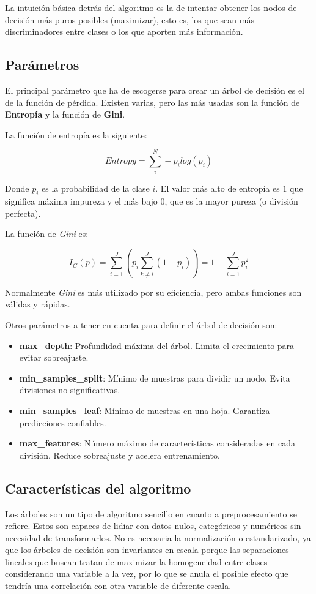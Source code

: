 \documentclass[12pt,letterpaper]{article}
\begin{document}
La intuición básica detrás del algoritmo es la de intentar obtener los nodos de decisión más puros posibles (maximizar), esto es, los que sean más discriminadores entre clases o los que aporten más información.

\subsection{Parámetros}
El principal parámetro que ha de escogerse para crear un árbol de decisión es el de la función de pérdida. Existen varias, pero las más usadas son la función de \textbf{Entropía} y la función de \textbf{Gini}.

La función de entropía es la siguiente:

\begin{equation}
    Entropy=\sum_{i}^{N}-p_{i}log(p_{i})
\end{equation}

Donde $p_i$ es la probabilidad de la clase $i$. El valor más alto de entropía es $1$ que significa máxima impureza y el más bajo $0$, que es la mayor pureza (o división perfecta).

La función de \textit{Gini} es:

\begin{equation}
    I_G(p)=\sum_{i=1}^J(p_i\sum_{k\neq i}^J(1-p_i))=1-\sum_{i=1}^{J}p_{i}^2
\end{equation}

Normalmente \textit{Gini} es más utilizado por su eficiencia, pero ambas funciones son válidas y rápidas.

Otros parámetros a tener en cuenta para definir el árbol de decisión son:

\begin{itemize}
    \item \textbf{max\_depth}: Profundidad máxima del árbol. Limita el crecimiento para evitar sobreajuste.
    \item \textbf{min\_samples\_split}: Mínimo de muestras para dividir un nodo. Evita divisiones no significativas.
    \item \textbf{min\_samples\_leaf}: Mínimo de muestras en una hoja. Garantiza predicciones confiables.
    \item \textbf{max\_features}: Número máximo de características consideradas en cada división. Reduce sobreajuste y acelera entrenamiento.
\end{itemize}

\subsection{Características del algoritmo}
Los árboles son un tipo de algoritmo sencillo en cuanto a preprocesamiento se refiere. Estos son capaces de lidiar con datos nulos, categóricos y numéricos sin necesidad de transformarlos. No es necesaria la normalización o estandarizado, ya que los árboles de decisión son invariantes en escala porque las separaciones lineales que buscan tratan de maximizar la homogeneidad entre clases considerando una variable a la vez, por lo que se anula el posible efecto que tendría una correlación con otra variable de diferente escala.
\end{document}

